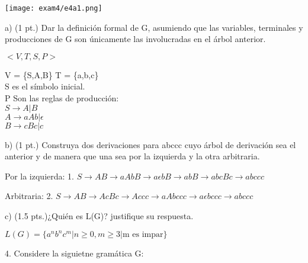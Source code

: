 \begin{questions}
\begin{center}
    \texttt{[image: exam4/e4a1.png]}
\end{center}


\begin{enumerate}
    a) (1 pt.) Dar la definición formal de G, asumiendo que las variables, terminales y producciones de G son únicamente las
    involucradas en el árbol anterior.

    \begin{solution}

        $<V,T,S,P>$

        V = \{S,A,B\}
        T = \{a,b,c\} \\
        S es el s\'imbolo inicial. \\
        P Son las reglas de producci\'on: \\
        $S \rightarrow A | B$ \\
        $A \rightarrow aAb | \epsilon$ \\
        $B \rightarrow cBc | c$ \\
    \end{solution}

    b) (1 pt.) Construya dos derivaciones para abccc cuyo árbol de derivación sea el anterior y de manera que una sea por la
    izquierda y la otra arbitraria.

    \begin{solution}

        Por la izquierda: 
        1. $S \rightarrow AB \rightarrow aAbB \rightarrow a \epsilon bB
        \rightarrow abB \rightarrow abcBc \rightarrow abccc$

        Arbitraria:
        2. $S \rightarrow AB \rightarrow AcBc \rightarrow Accc
        \rightarrow aAbccc \rightarrow a\epsilon bccc \rightarrow abccc$
    \end{solution}

    c) (1.5 pts.)¿Quién es L(G)? justifique su respuesta.

    \begin{solution}
        $L(G) = \{a^{n}b^{n}c^{m} | n \geq 0, m \geq 3 | \text{m es impar}\}$
        \\
    \end{solution}


\end{enumerate}

\begin{center}
    4. Considere la siguietne gram\'atica G:


\end{center}
\end{questions}
